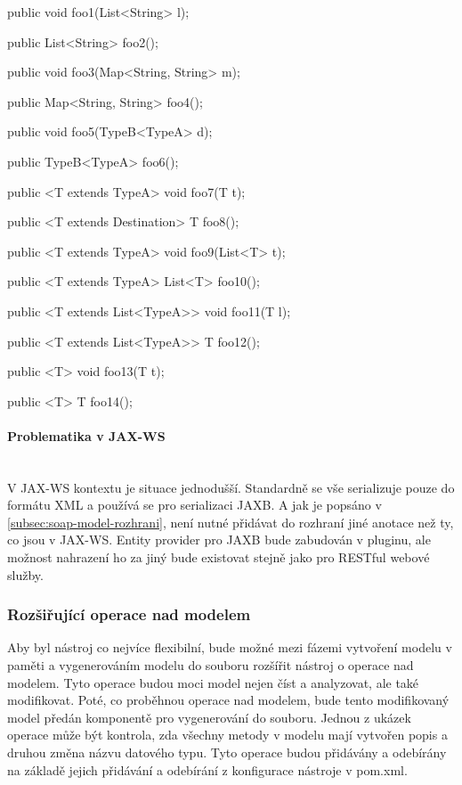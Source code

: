\documentclass[11pt,twoside,a4paper]{book}
\begin{document}
\begin{code}[frame=single, caption={Příklad podporovaných signatur
resource metod}, label={lst:signatury-metod}]
public void foo1(List<String> l);

public List<String> foo2();

public void foo3(Map<String, String> m);

public Map<String, String> foo4();

public void foo5(TypeB<TypeA> d);

public TypeB<TypeA> foo6();

public <T extends TypeA> void foo7(T t);

public <T extends Destination> T foo8();

public <T extends TypeA> void foo9(List<T> t);

public <T extends TypeA> List<T> foo10();

public <T extends List<TypeA>> void foo11(T l);

public <T extends List<TypeA>> T foo12();

public <T> void foo13(T t);

public <T> T foo14();
\end{code}

\paragraph{Problematika v JAX-WS}
\mbox{}\\

V JAX-WS kontextu je situace jednodušší. Standardně se vše serializuje pouze do
formátu XML a používá se pro serializaci JAXB. A jak je popsáno v
\ref{subsec:soap-model-rozhrani}, není nutné přidávat do rozhraní jiné anotace
než ty, co jsou v JAX-WS. Entity provider pro JAXB bude zabudován v pluginu, ale
možnost nahrazení ho za jiný bude existovat stejně jako pro RESTful webové
služby.

\subsubsection{Rozšiřující operace nad modelem}
\label{subsec:rozsirujici-operace-nad-modelem}

Aby byl nástroj co nejvíce flexibilní, bude možné mezi fázemi vytvoření modelu v
paměti a vygenerováním modelu do souboru rozšířit nástroj o operace nad modelem.
Tyto operace budou moci model nejen číst a analyzovat, ale také modifikovat.
Poté, co proběhnou operace nad modelem, bude tento modifikovaný model předán
komponentě pro vygenerování do souboru.
Jednou z ukázek operace může být kontrola, zda všechny metody v modelu mají
vytvořen popis a druhou změna názvu datového typu. Tyto operace budou přidávány
a odebírány na základě jejich přidávání a odebírání z konfigurace nástroje v
pom.xml.
\end{document}
